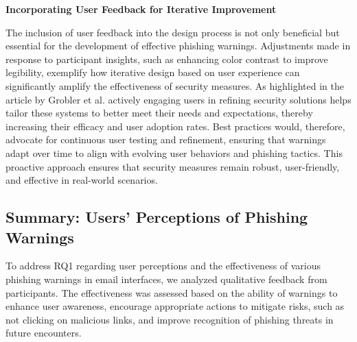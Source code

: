 \documentclass[
  a4paper,  %
  twoside,  %
  bibliography=totoc,
  headsepline,
  cleardoublepage=empty,
  parskip=half,
  draft=false
]{scrbook}
\begin{document}
\textbf{Incorporating User Feedback for Iterative Improvement}

The inclusion of user feedback into the design process is not only beneficial but essential for the development of effective phishing warnings. Adjustments made in response to participant insights, such as enhancing color contrast to improve legibility, exemplify how iterative design based on user experience can significantly amplify the effectiveness of security measures. As highlighted in the article by Grobler et al. \cite{grobler} actively engaging users in refining security solutions helps tailor these systems to better meet their needs and expectations, thereby increasing their efficacy and user adoption rates. Best practices would, therefore, advocate for continuous user testing and refinement, ensuring that warnings adapt over time to align with evolving user behaviors and phishing tactics. This proactive approach ensures that security measures remain robust, user-friendly, and effective in real-world scenarios.

\subsection{Summary: Users’ Perceptions of Phishing Warnings}
To address RQ1 regarding user perceptions and the effectiveness of various phishing warnings in email interfaces, we analyzed qualitative feedback from participants. The effectiveness was assessed based on the ability of warnings to enhance user awareness, encourage appropriate actions to mitigate risks, such as not clicking on malicious links, and improve recognition of phishing threats in future encounters.
\end{document}
